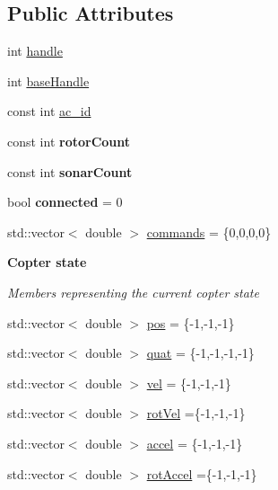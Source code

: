 \subsection*{Public Attributes}
\begin{DoxyCompactItemize}
\item 
int \hyperlink{classFinken_a96990553bc26c8bf26effe8edd6e6369}{handle}
\item 
int \hyperlink{classFinken_aef4736605ea21831e5340f66a931f8ac}{base\+Handle}
\item 
const int \hyperlink{classFinken_a496f5024f0876710ca1cfd55a2924e85}{ac\+\_\+id}
\item 
const int {\bfseries rotor\+Count}\hypertarget{classFinken_a2de6be70e0baaf63641df0214bf1f7a2}{}\label{classFinken_a2de6be70e0baaf63641df0214bf1f7a2}

\item 
const int {\bfseries sonar\+Count}\hypertarget{classFinken_a92ae4d32222c44c17a4cea91055569d9}{}\label{classFinken_a92ae4d32222c44c17a4cea91055569d9}

\item 
bool {\bfseries connected} = 0\hypertarget{classFinken_a83131e08852cbcebaffa1eef80164a6e}{}\label{classFinken_a83131e08852cbcebaffa1eef80164a6e}

\item 
std\+::vector$<$ double $>$ \hyperlink{classFinken_aa4fe546d88b52ff92990bd67ced70567}{commands} = \{0,0,0,0\}
\end{DoxyCompactItemize}
\begin{Indent}{\bf Copter state}\par
{\em \label{classFinken_copterstate}%
\hypertarget{classFinken_copterstate}{}%
 Members representing the current copter state }\begin{DoxyCompactItemize}
\item 
std\+::vector$<$ double $>$ \hyperlink{classFinken_a726c0ea1d756fe0837a3f042665d8d4a}{pos} = \{-\/1,-\/1,-\/1\}
\item 
std\+::vector$<$ double $>$ \hyperlink{classFinken_a3968cbe3b6f76678367ecb61f044a221}{quat} = \{-\/1,-\/1,-\/1,-\/1\}
\item 
std\+::vector$<$ double $>$ \hyperlink{classFinken_a4dd260e6384e7cfb8040bd53fe1c2d62}{vel} = \{-\/1,-\/1,-\/1\}
\item 
std\+::vector$<$ double $>$ \hyperlink{classFinken_a518ab8ab8ac8cf54c0b79cbc1ec2075f}{rot\+Vel} =\{-\/1,-\/1,-\/1\}
\item 
std\+::vector$<$ double $>$ \hyperlink{classFinken_a6f9723479baee5573447036270a2a722}{accel} = \{-\/1,-\/1,-\/1\}
\item 
std\+::vector$<$ double $>$ \hyperlink{classFinken_ab1b738a1b691879be240b1b9488f7009}{rot\+Accel} =\{-\/1,-\/1,-\/1\}
\end{DoxyCompactItemize}
\end{Indent}


